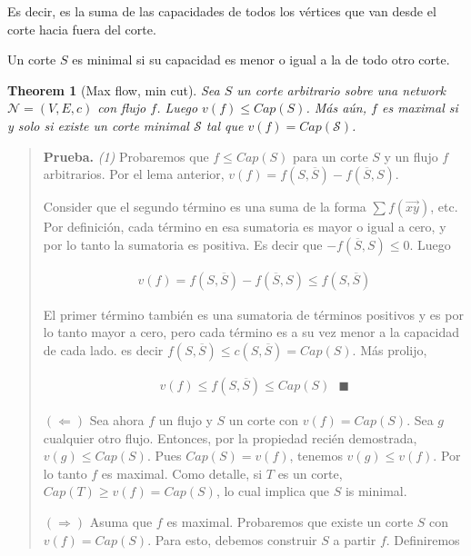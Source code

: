 \documentclass[a4paper, 12pt]{article}
\newtheorem{theorem}{Theorem}
\newtheorem{theorem}{Theorem}
\begin{document}
Es decir, es la suma de las capacidades de todos los vértices que van desde el
corte hacia fuera del corte.

\begin{definition}
    Un corte $S$ es minimal si su capacidad es menor o igual a la de todo otro
    corte.
\end{definition}

\begin{theorem}[Max flow, min cut]
    Sea $S$ un corte arbitrario sobre una network $\mathcal{N} = (V, E, c)$ con
    flujo $f$. Luego $v(f) \leq Cap(S)$. Más aún, $f$ es maximal si y solo si
    existe un corte minimal $\mathcal{S}$ tal que $v(f) =
    Cap(\mathcal{S})$.
\end{theorem}


\small
\begin{quote}

\textbf{Prueba.} \textit{(1)} Probaremos que $f \leq Cap(S)$ para un corte $S$ y
un flujo $f$ arbitrarios. Por el lema anterior, $v(f) = f(S, \overline{S}) -
f(\overline{S}, S)$.

Consider que el segundo término es una suma de la forma $\sum
f(\overrightarrow{xy})$, etc. Por definición, cada término en esa sumatoria es
mayor o igual a cero, y por lo tanto la sumatoria es positiva. Es decir que
$-f(\overline{S}, S) \leq 0$. Luego 

\begin{align*}
    v(f) = f(S, \overline{S}) - f(\overline{S}, S) \leq f(S, \overline{S})
\end{align*}

El primer término también es una sumatoria de términos positivos y es por lo
tanto mayor a cero, pero cada término es a su vez menor a la capacidad de cada
lado. es decir $f(S, \overline{S}) \leq c(S, \overline{S}) = Cap(S)$. Más
prolijo, 

\begin{align*}
    v(f) \leq f(S, \overline{S}) \leq Cap(S) ~ ~ ~ \blacksquare
\end{align*}

$(\Leftarrow)$ Sea ahora $f$ un flujo y $S$ un corte con $v(f) = Cap(S)$. Sea
$g$ cualquier otro flujo. Entonces, por la propiedad recién demostrada, $v(g)
\leq Cap(S)$. Pues $Cap(S) = v(f)$, tenemos $v(g) \leq v(f)$. Por lo tanto $f$
es maximal. Como detalle, si $T$ es un corte, $Cap(T) \geq v(f) = Cap(S)$, lo
cual implica que $S$ is minimal.

$(\Rightarrow)$ Asuma que $f$ es maximal. Probaremos que existe un corte $S$ con
$v(f) = Cap(S)$. Para esto, debemos construir $S$ a partir $f$. Definiremos 


\end{quote}
\end{document}
